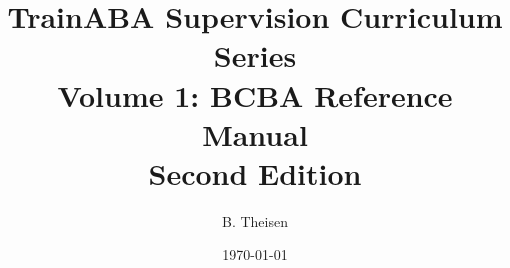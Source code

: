 \documentclass[12pt]{book}
\title{TrainABA Supervision Curriculum Series\\ Volume 1: BCBA Reference Manual \\Second Edition}
\author{B. Theisen}
\date{\today}
\begin{document}
     \maketitle
     \tableofcontents
     \listoffigures
     \listoftables
% 
 
 
% 
	\nocite{*}	
	\printbibliography   
     \printindex
\end{document}
